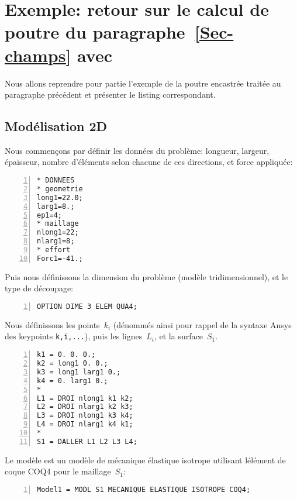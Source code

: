 \section{Exemple: retour sur le calcul de poutre du paragraphe~\ref{Sec-champs} avec \castem}
Nous allons reprendre pour partie l'exemple de la poutre encastrée traitée au paragraphe précédent et présenter le listing \castem correspondant.

\medskip
\subsection{Modélisation 2D}

Nous commençons par définir les données du problème: longueur, largeur, épaisseur, nombre d'éléments
selon chacune de ces directions, et force appliquée:

\begin{Verbatim}[numbers=left,numbersep=3pt]
* DONNEES
* geometrie
long1=22.0;
larg1=8.;
ep1=4;
* maillage
nlong1=22;
nlarg1=8;
* effort
Forc1=-41.;
\end{Verbatim}

\medskip
Puis nous définissons la dimension du problème (modèle tridimensionnel), et le type de découpage:

\begin{Verbatim}[numbers=left,numbersep=3pt,firstnumber=last]
OPTION DIME 3 ELEM QUA4;
\end{Verbatim}

\medskip
Nous définissons les points~$k_i$ (dénommés ainsi pour rappel de la syntaxe Ansys des keypoints \verb|k,i,...|), puis les
lignes~$L_i$, et la surface~$S_1$.

\begin{Verbatim}[numbers=left,numbersep=3pt,firstnumber=last]
k1 = 0. 0. 0.;
k2 = long1 0. 0.;
k3 = long1 larg1 0.;
k4 = 0. larg1 0.;
*
L1 = DROI nlong1 k1 k2;
L2 = DROI nlarg1 k2 k3;
L3 = DROI nlong1 k3 k4;
L4 = DROI nlarg1 k4 k1;
*
S1 = DALLER L1 L2 L3 L4;
\end{Verbatim}

\medskip
Le modèle est un modèle de mécanique élastique isotrope utilisant lélément de coque COQ4 pour le maillage~$S_1$:

\begin{Verbatim}[numbers=left,numbersep=3pt,firstnumber=last]
Model1 = MODL S1 MECANIQUE ELASTIQUE ISOTROPE COQ4;
\end{Verbatim}


